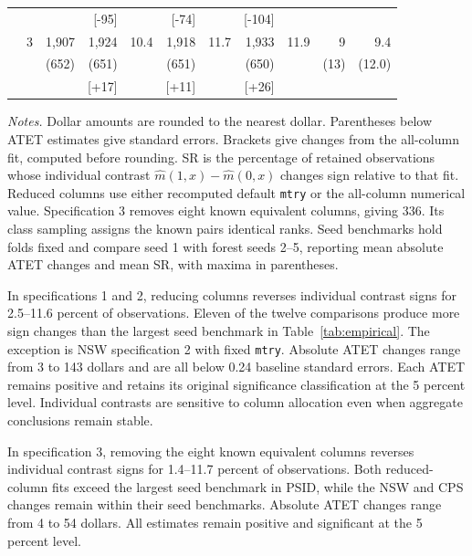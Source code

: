 \documentclass[12pt]{article}
\newcommand{\legend}[1]{\par\medskip\begin{minipage}{\linewidth}\footnotesize \textit{Notes.} #1 \end{minipage}}
\begin{document}
\begin{table}[p]
{\begin{minipage}{\linewidth}
{\begin{tabular*}{\linewidth}{@{\extracolsep{\fill}}lcrrrrrrrrr@{}}
 &  &  & {\footnotesize [-95]} &  & {\footnotesize [-74]} &  & {\footnotesize [-104]} &  &  & \\[4pt]
 & 3 & 1,907 & 1,924 & 10.4 & 1,918 & 11.7 & 1,933 & 11.9 & 9 & 9.4\\[-1pt]
 &  & {\footnotesize (652)} & {\footnotesize (651)} &  & {\footnotesize (651)} &  & {\footnotesize (650)} &  & {\footnotesize (13)} & {\footnotesize (12.0)}\\[-1pt]
 &  &  & {\footnotesize [+17]} &  & {\footnotesize [+11]} &  & {\footnotesize [+26]} &  &  & \\[2pt]
\bottomrule
\end{tabular*}}
\ifdim\wd\empiricalbody>\linewidth
  \PackageError{empiricaltables}{Table 2 exceeds the page width}{Reduce table spacing.}
\fi
\usebox{\empiricalbody}
\legend{Dollar amounts are rounded to the nearest dollar. Parentheses below ATET estimates give standard errors. Brackets give changes from the all-column fit, computed before rounding. SR is the percentage of retained observations whose individual contrast \(\widehat m(1,x)-\widehat m(0,x)\) changes sign relative to that fit. Reduced columns use either recomputed default \texttt{mtry} or the all-column numerical value. Specification 3 removes eight known equivalent columns, giving 336. Its class sampling assigns the known pairs identical ranks. Seed benchmarks hold folds fixed and compare seed 1 with forest seeds 2--5, reporting mean absolute ATET changes and mean SR, with maxima in parentheses.}
\end{minipage}}
\ifdim\dimexpr\ht\empiricalpage+\dp\empiricalpage\relax>\textheight
  \PackageError{empiricaltables}{Table 2 exceeds the page height}{Reduce table spacing.}
\fi
\usebox{\empiricalpage}
\end{table}

In specifications 1 and 2, reducing columns reverses individual contrast signs for 2.5--11.6 percent of observations. Eleven of the twelve comparisons produce more sign changes than the largest seed benchmark in Table~\ref{tab:empirical}. The exception is NSW specification 2 with fixed \texttt{mtry}. Absolute ATET changes range from 3 to 143 dollars and are all below 0.24 baseline standard errors. Each ATET remains positive and retains its original significance classification at the 5 percent level. Individual contrasts are sensitive to column allocation even when aggregate conclusions remain stable.

In specification 3, removing the eight known equivalent columns reverses individual contrast signs for 1.4--11.7 percent of observations. Both reduced-column fits exceed the largest seed benchmark in PSID, while the NSW and CPS changes remain within their seed benchmarks. Absolute ATET changes range from 4 to 54 dollars. All estimates remain positive and significant at the 5 percent level.
\end{document}
